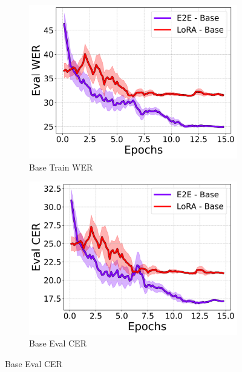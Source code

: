 \documentclass[10pt,twocolumn,letterpaper]{article}
\begin{document}
\begin{figure}[t]
\begin{subfigure}[b]{0.24\textwidth}
        \includegraphics[width=\textwidth]{./base/eval_wer_line.png}
        \caption{Base Train WER}
    \end{subfigure}
    \begin{subfigure}[b]{0.24\textwidth}
        \centering
        \includegraphics[width=\textwidth]{./base/eval_cer_line.png}
        \caption{Base Eval CER}
    \end{subfigure}
    

\end{figure}
\end{document}
